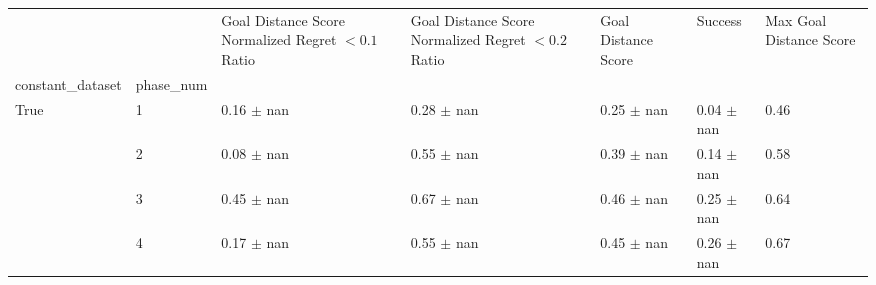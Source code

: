 \begin{tabular}{lllllll}
\toprule
 &  & Goal Distance Score Normalized Regret $< 0.1$ Ratio & Goal Distance Score Normalized Regret $< 0.2$ Ratio & Goal Distance Score & Success & Max Goal Distance Score \\
constant_dataset & phase_num &  &  &  &  &  \\
\midrule
\multirow[t]{4}{*}{True} & 1 & 0.16 $\pm$ nan & 0.28 $\pm$ nan & 0.25 $\pm$ nan & 0.04 $\pm$ nan & 0.46 \\
 & 2 & 0.08 $\pm$ nan & 0.55 $\pm$ nan & 0.39 $\pm$ nan & 0.14 $\pm$ nan & 0.58 \\
 & 3 & 0.45 $\pm$ nan & 0.67 $\pm$ nan & 0.46 $\pm$ nan & 0.25 $\pm$ nan & 0.64 \\
 & 4 & 0.17 $\pm$ nan & 0.55 $\pm$ nan & 0.45 $\pm$ nan & 0.26 $\pm$ nan & 0.67 \\
\cline{1-7}
\bottomrule
\end{tabular}
